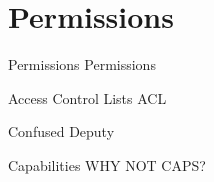 \section[Permissions]{Permissions}
\begin{frame}{Permissions}
  Permissions
\end{frame}

\begin{frame}{Access Control Lists}
  ACL
\end{frame}

\begin{frame}{Confused Deputy}
\end{frame}

\begin{frame}{Capabilities}
  WHY NOT CAPS?
\end{frame}



